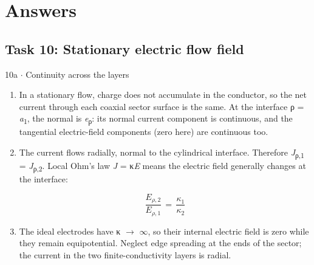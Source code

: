 \documentclass[11pt]{article}
\begin{document}
\section{Answers}
\begin{keepsection}\subsection{Task 10: Stationary electric flow field}

\begin{workedbox}{10a \ensuremath{\cdot} Continuity across the layers}
\begin{enumerate}
\item In a stationary flow, charge does not accumulate in the conductor, so the net current through each coaxial sector surface is the same. At the interface ρ = \textit{a}\textsubscript{1}, the normal is \textit{e}\textsubscript{ρ}: its normal current component is continuous, and the tangential electric-field components (zero here) are continuous too.
\item {}
The current flows radially, normal to the cylindrical interface. Therefore \textit{J}\textsubscript{ρ,1} = \textit{J}\textsubscript{ρ,2}. Local Ohm’s law \textit{J} = κ\textit{E} means the electric field generally changes at the interface:

\begin{equation*}\dfrac{{E}_{ρ,2}}{{E}_{ρ,1}}\, =\, \dfrac{κ_{1}}{κ_{2}}\end{equation*}
\item The ideal electrodes have κ \ensuremath{\to} \ensuremath{\infty}, so their internal electric field is zero while they remain equipotential. Neglect edge spreading at the ends of the sector; the current in the two finite-conductivity layers is radial.
\end{enumerate}
\end{workedbox}

\end{keepsection}
\end{document}
